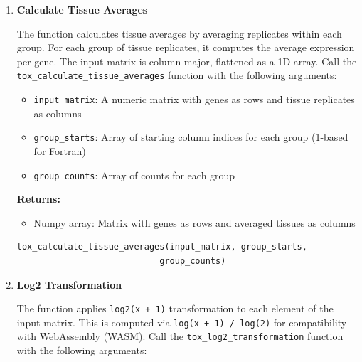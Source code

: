 \begin{enumerate}
\begin{enumerate}
            \item \textbf{Calculate Tissue Averages}
                  
                  The function calculates tissue averages by averaging replicates within
                  each group. For each group of tissue replicates, it computes the average
                  expression per gene. The input matrix is column-major, flattened as a 1D
                  array. Call the \texttt{tox\_calculate\_tissue\_averages} function with
                  the following arguments:
                  
                  \begin{itemize}
                    \item \texttt{input\_matrix}: A numeric matrix with genes as rows and
                          tissue replicates as columns
                          
                    \item \texttt{group\_starts}: Array of starting column indices for each
                          group (1-based for Fortran)
                          
                    \item \texttt{group\_counts}: Array of counts for each group
                  \end{itemize}
                  
                  \textbf{Returns:}
                  \begin{itemize}
                    \item Numpy array: Matrix with genes as rows and averaged tissues as
                          columns
                  \end{itemize}
                  \begin{lstlisting}[language=Python, caption={Python Tissue Averages Calculation}]
tox_calculate_tissue_averages(input_matrix, group_starts, 
                            group_counts)
                  \end{lstlisting}
                  
            \item \textbf{Log2 Transformation}
                  
                  The function applies \texttt{log2(x + 1)} transformation to each
                  element of the input matrix. This is computed via \texttt{log(x + 1) /
                    log(2)} for compatibility with WebAssembly (WASM). Call the \texttt{tox\_log2\_transformation}
                  function with the following arguments:
                  

\end{enumerate}
\end{enumerate}
